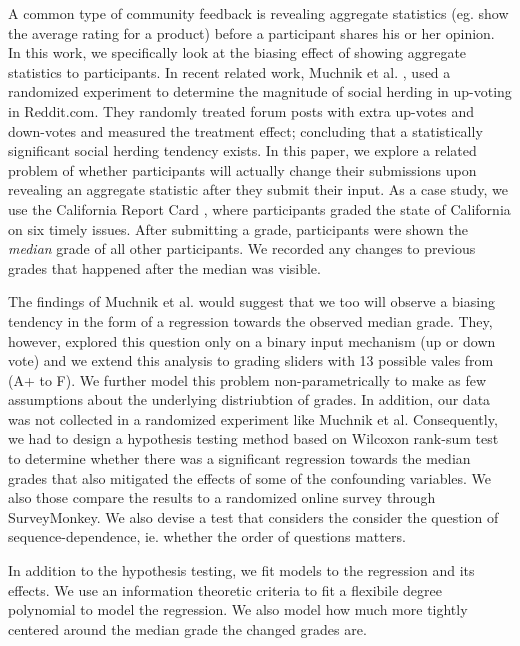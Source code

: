 A common type of community feedback is revealing aggregate statistics (eg. show the average rating for a product) before a participant shares his or her opinion.
In this work, we specifically look at the biasing effect of showing aggregate statistics to participants.
In recent related work, Muchnik et al. \cite{muchnik2013social}, used a randomized experiment to determine the magnitude of social herding in up-voting in Reddit.com.
They randomly treated forum posts with extra up-votes and down-votes and measured the treatment effect; concluding that a statistically significant social herding tendency exists.
In this paper, we explore a related problem of whether participants will actually change their submissions upon revealing an aggregate statistic after they submit their input.
As a case study, we use the California Report Card \cite{crc}, where participants graded the state of California on six timely issues.
After submitting a grade, participants were shown the \emph{median} grade of all other participants.
We recorded any changes to previous grades that happened after the median was visible.

The findings of Muchnik et al. would suggest that we too will observe a biasing tendency in the form of a regression towards the observed median grade.
They, however, explored this question only on a binary input mechanism (up or down vote) and we extend this analysis to grading sliders with 13 possible vales from (A+ to F).
We further model this problem non-parametrically to make as few assumptions about the underlying distriubtion of grades.
In addition, our data was not collected in a randomized experiment like Muchnik et al.
Consequently, we had to design a hypothesis testing method based on Wilcoxon rank-sum test \cite{lehmann2006nonparametrics} to determine whether there was a significant regression towards the median grades that also mitigated the effects of some of the confounding variables.
We also those compare the results to a randomized online survey through SurveyMonkey.
We also devise a test that considers the consider the question of sequence-dependence, ie. whether the order of questions matters. 

In addition to the hypothesis testing, we fit models to the regression and its effects.
We use an information theoretic criteria to fit a flexibile degree polynomial to model the regression.
We also model how much more tightly centered around the median grade the changed grades are.

